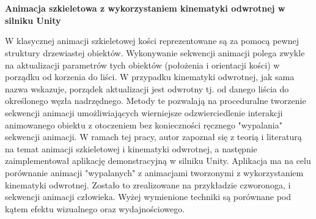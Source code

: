 \documentclass[oneside,12pt]{wipb}
\begin{document}
\maketitle
\chapter*{}
\noindent\textbf{Animacja szkieletowa z wykorzystaniem kinematyki odwrotnej w silniku Unity}

W klasycznej animacji szkieletowej kości reprezentowane są za pomocą pewnej
struktury drzewiastej obiektów. Wykonywanie sekwencji animacji polega zwykle na
aktualizacji parametrów tych obiektów (położenia i orientacji kości) w porządku
od korzenia do liści. W przypadku kinematyki odwrotnej, jak sama nazwa wskazuje,
porządek aktualizacji jest odwrotny tj. od danego liścia do określonego węzła
nadrzędnego. Metody te pozwalają na proceduralne tworzenie sekwencji animacji
umożliwiających wierniejsze odzwierciedlenie interakcji animowanego obiektu
z otoczeniem bez konieczności ręcznego "wypalania" sekwencji animacji. W ramach
tej pracy, autor zapoznał się z teorią i literaturą na temat animacji
szkieletowej i kinematyki odwrotnej, a następnie zaimplementował aplikację
demonstracyjną w silniku Unity. Aplikacja ma na celu porównanie animacji
"wypalanych" z animacjami tworzonymi z wykorzystaniem kinematyki odwrotnej.
Zostało to zrealizowane na przykładzie czworonoga, i sekwencji animacji
człowieka. Wyżej wymienione techniki są porównane pod kątem efektu wizualnego
oraz wydajnościowego. 

\tableofcontents
\thispagestyle{empty}
\setcounter{page}{0}
\pagestyle{plain}








%

\listoffigures
\listoftables
\end{document}
